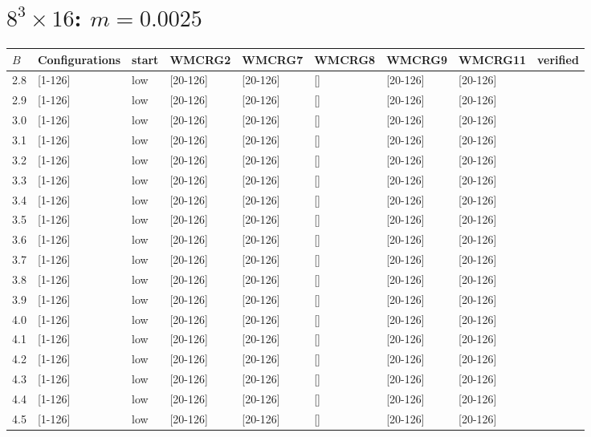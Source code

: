 \documentclass[11pt]{article}
\begin{document}
  \section{$8^3\times16$:  $m=0.0025$}
    \begin{tabular}{| l | l | l | l | l | l | l | l | l |}
      \hline
      $B$ & Configurations & start & WMCRG2 & WMCRG7 & WMCRG8 & WMCRG9 & WMCRG11 & verified\\
      \hline
      2.8 & [1-126] & low & [20-126] & [20-126] & [] & [20-126] & [20-126] &\\
      2.9 & [1-126] & low & [20-126] & [20-126] & [] & [20-126] & [20-126] &\\
      3.0 & [1-126] & low & [20-126] & [20-126] & [] & [20-126] & [20-126] &\\
      3.1 & [1-126] & low & [20-126] & [20-126] & [] & [20-126] & [20-126] &\\
      3.2 & [1-126] & low & [20-126] & [20-126] & [] & [20-126] & [20-126] &\\
      3.3 & [1-126] & low & [20-126] & [20-126] & [] & [20-126] & [20-126] &\\
      3.4 & [1-126] & low & [20-126] & [20-126] & [] & [20-126] & [20-126] &\\
      3.5 & [1-126] & low & [20-126] & [20-126] & [] & [20-126] & [20-126] &\\
      3.6 & [1-126] & low & [20-126] & [20-126] & [] & [20-126] & [20-126] &\\
      3.7 & [1-126] & low & [20-126] & [20-126] & [] & [20-126] & [20-126] &\\
      3.8 & [1-126] & low & [20-126] & [20-126] & [] & [20-126] & [20-126] &\\
      3.9 & [1-126] & low & [20-126] & [20-126] & [] & [20-126] & [20-126] &\\
      4.0 & [1-126] & low & [20-126] & [20-126] & [] & [20-126] & [20-126] &\\
      4.1 & [1-126] & low & [20-126] & [20-126] & [] & [20-126] & [20-126] &\\
      4.2 & [1-126] & low & [20-126] & [20-126] & [] & [20-126] & [20-126] &\\
      4.3 & [1-126] & low & [20-126] & [20-126] & [] & [20-126] & [20-126] &\\
      4.4 & [1-126] & low & [20-126] & [20-126] & [] & [20-126] & [20-126] &\\
      4.5 & [1-126] & low & [20-126] & [20-126] & [] & [20-126] & [20-126] &\\

\end{tabular}
\end{document}

